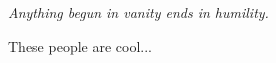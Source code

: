 \begin{acknowledgements}

\begin{center}
      \emph{Anything begun in vanity ends in humility.}
\end{center}
 
These people are cool...


\end{acknowledgements}



